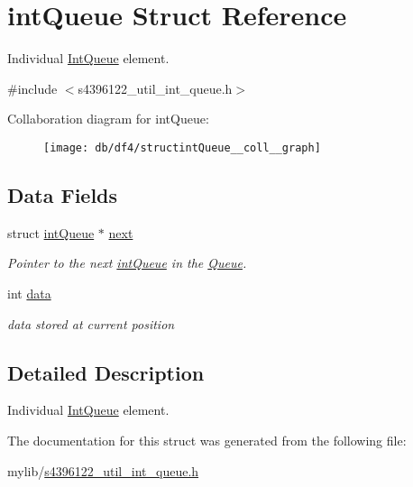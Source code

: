 \hypertarget{structintQueue}{}\section{int\+Queue Struct Reference}
\label{structintQueue}


Individual \hyperlink{structIntQueue}{Int\+Queue} element.  




{\ttfamily \#include $<$s4396122\+\_\+util\+\_\+int\+\_\+queue.\+h$>$}



Collaboration diagram for int\+Queue\+:\nopagebreak
\begin{figure}[H]
\begin{center}
\leavevmode
\texttt{[image: db/df4/structintQueue\_\_coll\_\_graph]}
\end{center}
\end{figure}
\subsection*{Data Fields}
\begin{DoxyCompactItemize}
\item 
struct \hyperlink{structintQueue}{int\+Queue} $\ast$ \hyperlink{structintQueue_a1702e8e91ebfca0b620791684046fff6}{next}\hypertarget{structintQueue_a1702e8e91ebfca0b620791684046fff6}{}\label{structintQueue_a1702e8e91ebfca0b620791684046fff6}

\begin{DoxyCompactList}\small\item\em Pointer to the next \hyperlink{structintQueue}{int\+Queue} in the \hyperlink{structQueue}{Queue}. \end{DoxyCompactList}\item 
int \hyperlink{structintQueue_a0d3aac3e8322327a2af544acf7986351}{data}\hypertarget{structintQueue_a0d3aac3e8322327a2af544acf7986351}{}\label{structintQueue_a0d3aac3e8322327a2af544acf7986351}

\begin{DoxyCompactList}\small\item\em data stored at current position \end{DoxyCompactList}\end{DoxyCompactItemize}


\subsection{Detailed Description}
Individual \hyperlink{structIntQueue}{Int\+Queue} element. 

The documentation for this struct was generated from the following file\+:\begin{DoxyCompactItemize}
\item 
mylib/\hyperlink{s4396122__util__int__queue_8h}{s4396122\+\_\+util\+\_\+int\+\_\+queue.\+h}\end{DoxyCompactItemize}
